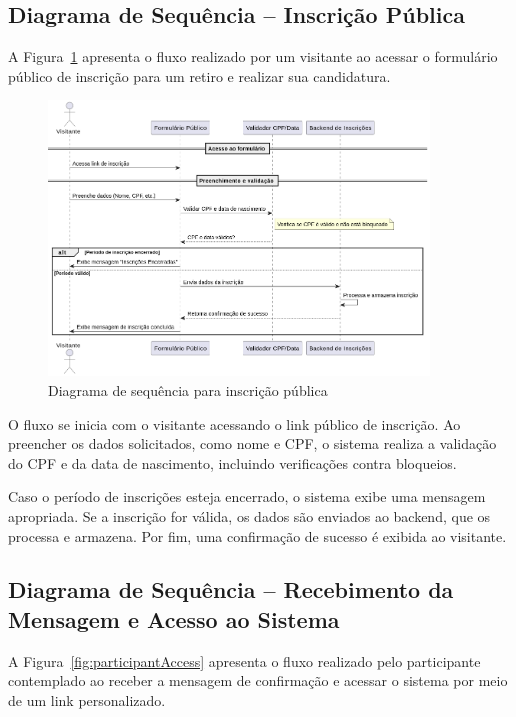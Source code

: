 \subsection{Diagrama de Sequência – Inscrição Pública}

A Figura~\ref{fig:publicInscription} apresenta o fluxo realizado por um visitante ao acessar o formulário público de inscrição para um retiro e realizar sua candidatura.

\begin{figure}[H]
    \centering
    \includegraphics[width=0.9\textwidth]{images/diagramasdesequencias/participantFormSubscription.png}
    \caption{Diagrama de sequência para inscrição pública}
    \label{fig:publicInscription}
\end{figure}

O fluxo se inicia com o visitante acessando o link público de inscrição. Ao preencher os dados solicitados, como nome e CPF, o sistema realiza a validação do CPF e da data de nascimento, incluindo verificações contra bloqueios.

Caso o período de inscrições esteja encerrado, o sistema exibe uma mensagem apropriada. Se a inscrição for válida, os dados são enviados ao backend, que os processa e armazena. Por fim, uma confirmação de sucesso é exibida ao visitante.


\subsection{Diagrama de Sequência – Recebimento da Mensagem e Acesso ao Sistema}

A Figura~\ref{fig:participantAccess} apresenta o fluxo realizado pelo participante contemplado ao receber a mensagem de confirmação e acessar o sistema por meio de um link personalizado.


